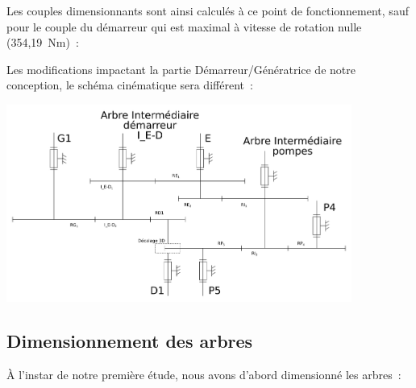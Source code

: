 \documentclass{config}
\begin{document}
\begin{spacing}{1.2}
Les couples dimensionnants sont ainsi calculés à ce point de fonctionnement, sauf pour le couple du démarreur qui est maximal à vitesse de rotation nulle (354,19 Nm) :

\begin{table}[h]
\centering
{}
\end{table}

Les modifications impactant la partie Démarreur/Génératrice de notre conception, le schéma cinématique sera différent :

\begin{center}
\includegraphics[width=0.85\textwidth]{Schema_cinematique_engrenages_V2.png}
\end{center}


\newpage

\subsection{Dimensionnement des arbres}

À l'instar de notre première étude, nous avons d'abord dimensionné les arbres : 

\begin{table}[h]
\centering
{}
\end{table}



\end{spacing}
\end{document}
